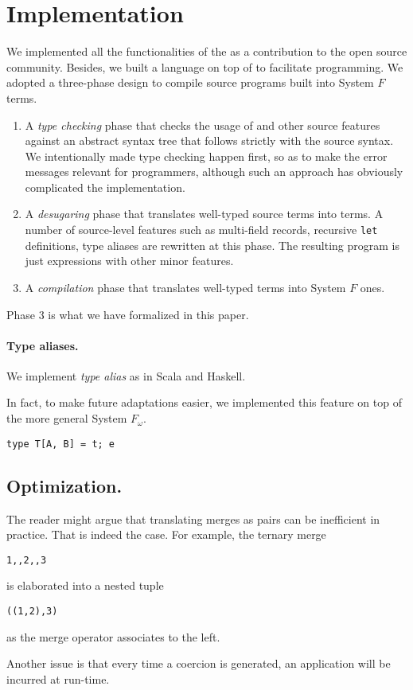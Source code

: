 \section{Implementation}

We implemented all the functionalities of the \name as a contribution to the
open source community. Besides, we built a language on top of \name to
facilitate programming. We adopted a three-phase design to compile source
programs built into System $ F $ terms.

\begin{enumerate}
\item A \emph{type checking} phase that checks the usage of \name and other
  source features against an abstract syntax tree that follows strictly with the
  source syntax. We intentionally made type checking happen first, so as to make
  the error messages relevant for programmers, although such an approach has
  obviously complicated the implementation.

\item A \emph{desugaring} phase that translates well-typed source terms into
  \name terms. A number of source-level features such as multi-field records,
  recursive \texttt{let} definitions, type aliases are rewritten at this phase.
  The resulting program is just \name expressions with other minor features.

\item A \emph{compilation} phase that translates well-typed \name terms
  into System $ F $ ones.
\end{enumerate}

Phase 3 is what we have formalized in this paper.

\paragraph{Type aliases.}

We implement \emph{type alias} as in Scala and Haskell.

In fact, to make future adaptations easier, we implemented this feature on top
of the more general System $ F_{\omega} $.


\begin{lstlisting}
type T[A, B] = t; e
\end{lstlisting}

\subsection{Optimization.}


The reader might argue that translating merges as pairs can be inefficient in
practice. That is indeed the case. For example, the ternary merge
\begin{lstlisting}
1,,2,,3 
\end{lstlisting}
is elaborated into a nested tuple
\begin{lstlisting}
((1,2),3)
\end{lstlisting}
as the merge operator associates to the left.

Another issue is that every time a coercion is generated, an application will be
incurred at run-time.
